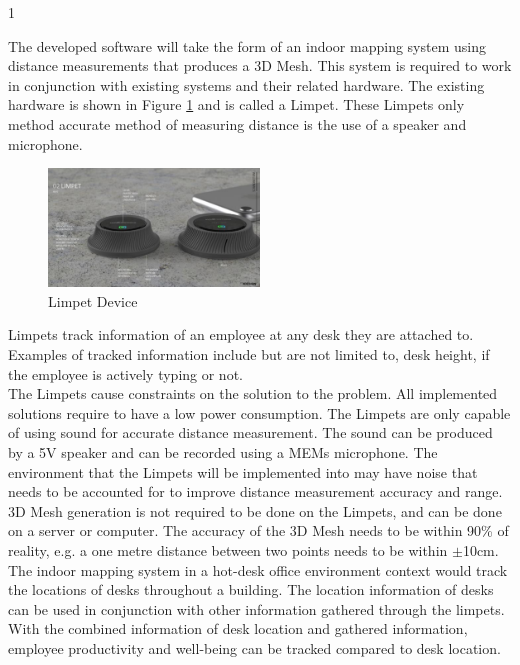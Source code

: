 1\documentclass{article}
\begin{document}
The developed software will take the form of an indoor mapping system using distance measurements that produces a 3D Mesh. This system is required to work in conjunction with existing systems and their related hardware. The existing hardware is shown in Figure \ref{fig:limpet} and is called a Limpet. These Limpets only method accurate method of measuring distance is the use of a speaker and microphone.\\

\begin{figure}[H]
	\centering
	\noindent\includegraphics[width=0.5\textwidth]{images/limpet}
	\caption{Limpet Device}
	\label{fig:limpet}
\end{figure}

Limpets track information of an employee at any desk they are attached to. Examples of tracked information include but are not limited to, desk height, if the employee is actively typing or not.\\

The Limpets cause constraints on the solution to the problem. All implemented solutions require to have a low power consumption. The Limpets are only capable of using sound for accurate distance measurement. The sound can be produced by a 5V speaker and can be recorded using a MEMs microphone. The environment that the Limpets will be implemented into may have noise that needs to be accounted for to improve distance measurement accuracy and range. 3D Mesh generation is not required to be done on the Limpets, and can be done on a server or computer. The accuracy of the 3D Mesh needs to be within 90\% of reality, e.g. a one metre distance between two points needs to be within $\pm$10cm.\\ 

The indoor mapping system in a hot-desk office environment context would track the locations of desks throughout a building. The location information of desks can be used in conjunction with other information gathered through the limpets. With the combined information of desk location and gathered information, employee productivity and well-being can be tracked compared to desk location.\\
\end{document}
